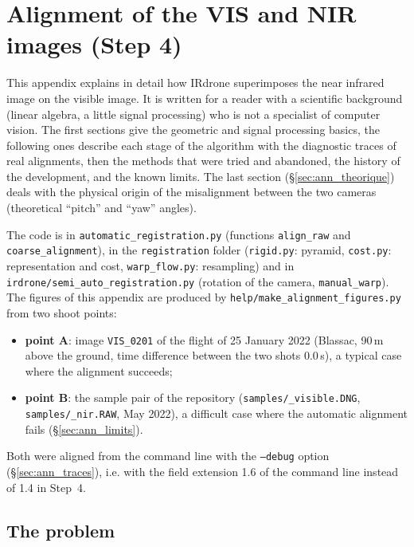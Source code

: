 \documentclass[a4paper,11pt]{report}
\begin{document}
\appendix
\chapter{Alignment of the VIS and NIR images (Step 4)}\label{sec:ann_algorithme}
This appendix explains in detail how IRdrone superimposes the near infrared image on the visible image. It is written for a reader with a scientific background (linear algebra, a little signal processing) who is not a specialist of computer vision. The first sections give the geometric and signal processing basics, the following ones describe each stage of the algorithm with the diagnostic traces of real alignments, then the methods that were tried and abandoned, the history of the development, and the known limits. The last section (\S\ref{sec:ann_theorique}) deals with the physical origin of the misalignment between the two cameras (theoretical ``pitch'' and ``yaw'' angles).

The code is in \texttt{automatic\_registration.py} (functions \texttt{align\_raw} and \texttt{coarse\_alignment}), in the \texttt{registration} folder (\texttt{rigid.py}: pyramid, \texttt{cost.py}: representation and cost, \texttt{warp\_flow.py}: resampling) and in \texttt{irdrone/semi\_auto\_registration.py} (rotation of the camera, \texttt{manual\_warp}). The figures of this appendix are produced by \texttt{help/make\_alignment\_figures.py} from two shoot points:
\begin{itemize}
	\item \textbf{point A}: image \texttt{VIS\_0201} of the flight of 25 January 2022 (Blassac, 90\,m above the ground, time difference between the two shots 0.0\,s), a typical case where the alignment succeeds;
	\item \textbf{point B}: the sample pair of the repository (\texttt{samples/\_visible.DNG}, \texttt{samples/\_nir.RAW}, May 2022), a difficult case where the automatic alignment fails (\S\ref{sec:ann_limits}).
\end{itemize}
Both were aligned from the command line with the \texttt{--debug} option (\S\ref{sec:ann_traces}), i.e. with the field extension 1.6 of the command line instead of 1.4 in Step~4.

\section{The problem}\label{sec:ann_problem}
\end{document}
